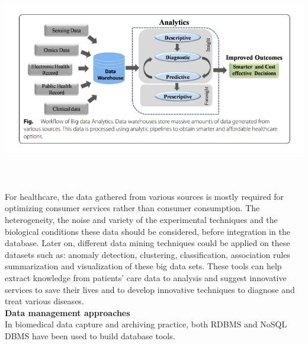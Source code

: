 \documentclass[10pt,a4paper,twoside]{article}
\begin{document}
\begin{center}
    \includegraphics[width=16cm, height=9cm]{analytics} \\[\baselineskip]
\end{center}

For healthcare, the data gathered from various sources is mostly required for optimizing consumer services rather than consumer consumption. The heterogeneity, the noise and variety of the experimental techniques and the biological conditions these data should be considered, before integration in the database. Later on, different data mining techniques could be applied on these datasets such as: anomaly detection, clustering, classification, association rules summarization and visualization of these big data sets. These tools can help extract knowledge from patients’ care data to analysis and suggest innovative services to save their lives and to develop innovative techniques to diagnose and treat various diseases.
\\[\baselineskip]

\textbf{Data management approaches }\\
In biomedical data capture and archiving practice, both RDBMS and NoSQL DBMS have been used to build database tools.
\end{document}
